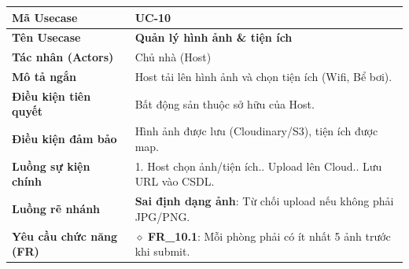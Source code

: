 \begin{table}[H]
\renewcommand{\arraystretch}{1.3}
\centering
\begin{tabularx}{\textwidth}{|p{4.5cm}|X|}
\hline
\cellcolor{gray!15}\bfseries Mã Usecase & \textbf{UC-10} \\ \hline
\cellcolor{gray!15}\bfseries Tên Usecase & \textbf{Quản lý hình ảnh \& tiện ích} \\ \hline
\cellcolor{gray!15}\bfseries Tác nhân (Actors) & Chủ nhà (Host) \\ \hline
\cellcolor{gray!15}\bfseries Mô tả ngắn & Host tải lên hình ảnh và chọn tiện ích (Wifi, Bể bơi). \\ \hline
\cellcolor{gray!15}\bfseries Điều kiện tiên quyết & Bất động sản thuộc sở hữu của Host. \\ \hline
\cellcolor{gray!15}\bfseries Điều kiện đảm bảo & Hình ảnh được lưu (Cloudinary/S3), tiện ích được map. \\ \hline
\cellcolor{gray!15}\bfseries Luồng sự kiện chính & 1. Host chọn ảnh/tiện ích.\newline 2. Upload lên Cloud.\newline 3. Lưu URL vào CSDL. \\ \hline
\cellcolor{gray!15}\bfseries Luồng rẽ nhánh & \textbf{Sai định dạng ảnh}: Từ chối upload nếu không phải JPG/PNG. \\ \hline
\cellcolor{gray!15}\bfseries Yêu cầu chức năng (FR) & $\diamond$ \textbf{FR\_10.1}: Mỗi phòng phải có ít nhất 5 ảnh trước khi submit. \\ \hline
\end{tabularx}
\end{table}

